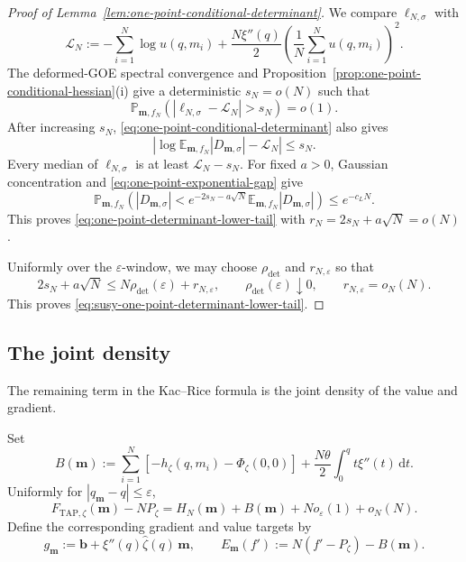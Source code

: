 \documentclass[a4paper,10pt,reqno]{amsart}
\numberwithin{equation}{section}
\newcommand{\ve}{\varepsilon}
\newcommand{\dP}{\mathbb{P}}%
\newcommand{\dE}{\mathbb{E}}%
\newcommand{\dd}{\mathrm{d}}
\newcommand{\TAP}{\mathrm{TAP}}
\newcommand{\bfm}{\mathbf{m}}
\newcommand{\bfb}{\mathbf{b}}
\begin{document}
\begin{proof}[Proof of Lemma~\ref{lem:one-point-conditional-determinant}]
		We compare \(\ell_{N,\sigma}\) with
		\[
		\mathcal L_N
		:=
		-\sum_{i=1}^N\log u(q,m_i)
		+\frac{N\xi''(q)}2
		\left(\frac1N\sum_{i=1}^Nu(q,m_i)\right)^2.
		\]
		The deformed-GOE spectral convergence and
		Proposition~\ref{prop:one-point-conditional-hessian}\textup{(i)} give a
		deterministic \(s_N=o(N)\) such that
		\[
		\dP_{\bfm,f_N}\left(
		|\ell_{N,\sigma}-\mathcal L_N|>s_N
		\right)=o(1).
		\]
		After increasing \(s_N\), \eqref{eq:one-point-conditional-determinant}
		also gives
		\[
		\left|
		\log\dE_{\bfm,f_N}|D_{\bfm,\sigma}|
		-\mathcal L_N
		\right|
		\le s_N.
		\]
		Every median of \(\ell_{N,\sigma}\) is at least
		\(\mathcal L_N-s_N\). For fixed \(a>0\), Gaussian concentration and
		\eqref{eq:one-point-exponential-gap} give
		\[
		\dP_{\bfm,f_N}\left(
		|D_{\bfm,\sigma}|
		<
		e^{-2s_N-a\sqrt N}
		\dE_{\bfm,f_N}|D_{\bfm,\sigma}|
		\right)
		\le e^{-c_LN}.
		\]
		This proves \eqref{eq:one-point-determinant-lower-tail} with
		\(r_N=2s_N+a\sqrt N=o(N)\).
		
		Uniformly over the \(\ve\)-window, we may choose \(\rho_{\det}\) and
		\(r_{N,\ve}\) so that
		\[
		2s_N+a\sqrt N
		\le N\rho_{\det}(\ve)+r_{N,\ve},
		\qquad
		\rho_{\det}(\ve)\downarrow0,
		\qquad
		r_{N,\ve}=o_N(N).
		\]
		This proves
		\eqref{eq:susy-one-point-determinant-lower-tail}.
	\end{proof}
	
	\subsection{The joint density}
	
	The remaining term in the Kac--Rice formula is the joint density of the
	value and gradient.
	
	Set
	\[
	B(\bfm)
	:=
	\sum_{i=1}^N
	\left[
	-h_\zeta(q,m_i)-\Phi_\zeta(0,0)
	\right]
	+\frac{N\theta}{2}\int_0^q t\xi''(t)\,\dd t .
	\]
	Uniformly for \(|q_\bfm-q|\le\ve\),
	\begin{equation}\label{eq:one-point-decomposition}
		F_{\TAP,\zeta}(\bfm)-NP_\zeta
		=
		H_N(\bfm)+B(\bfm)+N o_\ve(1)+o_N(N).
	\end{equation}
	Define the corresponding gradient and value targets by
	\begin{equation}\label{eq:one-point-gE}
		g_\bfm:=\bfb+\xi''(q)\widehat\zeta(q)\,\bfm,
		\qquad
		E_\bfm(f')
		:=
		N(f'-P_\zeta)-B(\bfm).
	\end{equation}
	
\end{document}
